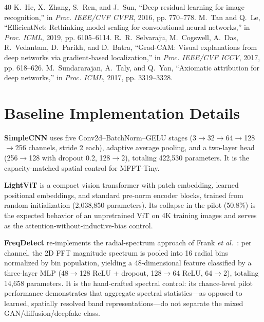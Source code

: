 \documentclass[journal]{IEEEtran}
\begin{document}
\begin{thebibliography}{40}
 K.~He, X.~Zhang, S.~Ren, and J.~Sun, ``Deep residual learning for image recognition,'' in \textit{Proc. IEEE/CVF CVPR}, 2016, pp. 770--778.
 M.~Tan and Q.~Le, ``EfficientNet: Rethinking model scaling for convolutional neural networks,'' in \textit{Proc. ICML}, 2019, pp. 6105--6114.
 R.~R.~Selvaraju, M.~Cogswell, A.~Das, R.~Vedantam, D.~Parikh, and D.~Batra, ``Grad-CAM: Visual explanations from deep networks via gradient-based localization,'' in \textit{Proc. IEEE/CVF ICCV}, 2017, pp. 618--626.
 M.~Sundararajan, A.~Taly, and Q.~Yan, ``Axiomatic attribution for deep networks,'' in \textit{Proc. ICML}, 2017, pp. 3319--3328.

\end{thebibliography}

\appendices

\section{Baseline Implementation Details}
\label{app:baselines}
\textbf{SimpleCNN} uses five Conv2d--BatchNorm--GELU stages (3$\rightarrow$32$\rightarrow$64$\rightarrow$128$\rightarrow$256 channels, stride 2 each), adaptive average pooling, and a two-layer head (256$\rightarrow$128 with dropout 0.2, 128$\rightarrow$2), totaling 422{,}530 parameters. It is the capacity-matched spatial control for MFFT-Tiny.

\textbf{LightViT} is a compact vision transformer with patch embedding, learned positional embeddings, and standard pre-norm encoder blocks, trained from random initialization (2{,}038{,}850 parameters). Its collapse in the pilot (50.8\%) is the expected behavior of an unpretrained ViT on 4K training images and serves as the attention-without-inductive-bias control.

\textbf{FreqDetect} re-implements the radial-spectrum approach of Frank \textit{et al.}~\cite{frank2020}: per channel, the 2D FFT magnitude spectrum is pooled into 16 radial bins normalized by bin population, yielding a 48-dimensional feature classified by a three-layer MLP (48$\rightarrow$128 ReLU + dropout, 128$\rightarrow$64 ReLU, 64$\rightarrow$2), totaling 14{,}658 parameters. It is the hand-crafted spectral control: its chance-level pilot performance demonstrates that aggregate spectral statistics---as opposed to learned, spatially resolved band representations---do not separate the mixed GAN/diffusion/deepfake class.
\end{document}
